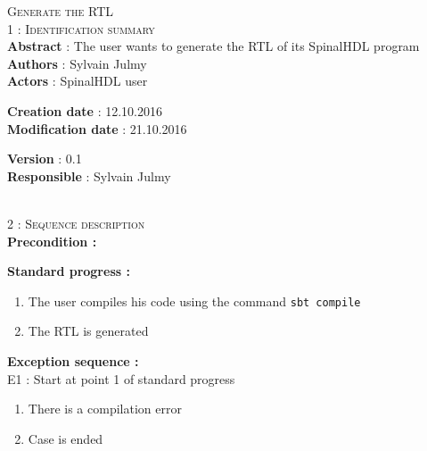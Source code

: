 \begin{flushleft}
    \textsc{\huge Generate the RTL}\\[0.5cm]

    \BlackLine
    \textsc{\Large 1 : Identification summary}\\[0.3cm]

        \textbf{\large Abstract} : The user wants to generate the RTL of its SpinalHDL program\\[0.1cm]

        \textbf{\large Authors} : Sylvain Julmy \\[0.3cm]			

        \textbf{\large Actors} : SpinalHDL user \\[0.1cm]	
    \begin{minipage}{0.40\textwidth}
        \begin{flushleft}	
            \textbf{\large Creation date} : 12.10.2016 \\[0.1cm]

            \textbf{\large Modification date} : 21.10.2016 \\[0.1cm]
        \end{flushleft}
    \end{minipage}
    \begin{minipage}{0.40\textwidth}
        \begin{flushleft}
            \textbf{\large Version} : 0.1 \\[0.1cm]

            \textbf{\large Responsible} : Sylvain Julmy \\[0.1cm]
        \end{flushleft}
    \end{minipage}
    \\[0.5cm]
    \BlackLine
    \textsc{\Large 2 : Sequence description}\\[0.3cm]

    \textbf{\large Precondition :}

    \textbf{\large  Standard progress :}
    \begin{enumerate}[nosep]
        \item The user compiles his code using the command \verb|sbt compile|
        \item The RTL is generated
    \end{enumerate}

    \textbf{\large  Exception sequence :}\\
    E1 : Start at point 1 of standard progress
    \begin{enumerate}[nosep]
        \item There is a compilation error
        \item Case is ended
    \end{enumerate}


\end{flushleft}

